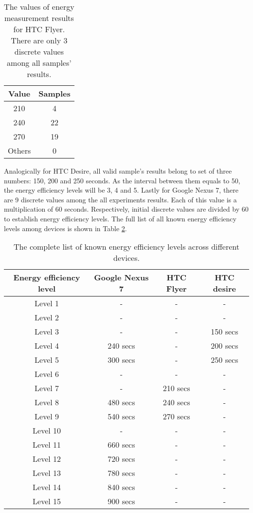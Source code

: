 \begin{table}[H]
\centering
    \begin{tabular}{| c | c |}
    \hline
    	Value & Samples \\ \hline
    	210 & 4 \\ \hline
    	240 & 22 \\ \hline
    	270 & 19 \\ \hline
    	Others & 0 \\ \hline
    \end{tabular}
    \caption{The values of energy measurement results for HTC Flyer. There are only 3 discrete values among all samples' results.}
	\label{table:discretevalues}
\end{table}
			
Analogically for HTC Desire, all valid sample's results belong to set of three numbers: 150, 200 and 250 seconds. As the interval between them equals to 50, the energy efficiency levels will be 3, 4 and 5. Lastly for Google Nexus 7, there are 9 discrete values among the all experiments results. Each of this value is a multiplication of 60 seconds. Respectively, initial discrete values are divided by 60 to establish energy efficiency levels. The full list of all known energy efficiency levels among devices is shown in Table \ref{table:energy_efficiency_levels}.
		
	
\begin{table}[H]
\centering
    \begin{tabular}{| c | c | c | c |}
    \hline
      Energy efficiency level & Google Nexus 7 & HTC Flyer & HTC desire \\ \hline
    Level 1 & -& - &  -\\ \hline
  	Level 2 & - & - & -\\ \hline
  	Level 3 & - & - & 150 secs\\ \hline
    Level 4 & 240 secs & - & 200 secs\\ \hline
    Level 5 & 300 secs & - & 250 secs \\ \hline
    Level 6 & - & - & - \\\hline
    Level 7 & - & 210 secs & - \\ \hline
    Level 8 & 480 secs & 240  secs & - \\ \hline
    Level 9 & 540 secs & 270 secs & - \\ \hline
    Level 10 & - & - & - \\ \hline
    Level 11 & 660 secs & - & - \\ \hline
    Level 12 & 720 secs & - & -\\ \hline
    Level 13 & 780 secs & - & - \\ \hline
    Level 14 & 840 secs & - & -\\ \hline
    Level 15 & 900 secs & -& -\\ \hline
    \end{tabular}
    \caption{The complete list of known energy efficiency levels across different devices.}
	\label{table:energy_efficiency_levels}
\end{table}
	

